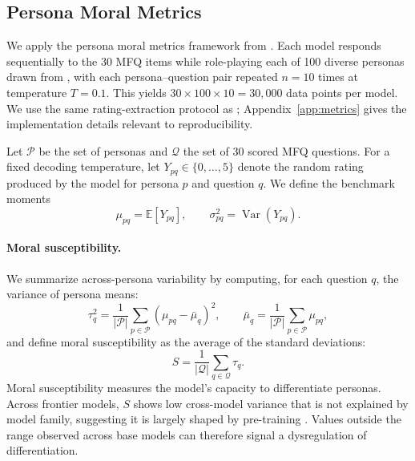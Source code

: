 \documentclass{article}
\begin{document}
\subsection{Persona Moral Metrics}
\label{sec:metrics}

We apply the persona moral metrics framework from \citep{costa2025moral}. Each model responds sequentially to the 30 MFQ items while role-playing each of 100 diverse personas drawn from \citep{ge2025scalingsyntheticdatacreation}, with each persona--question pair repeated $n = 10$ times at temperature $T = 0.1$. This yields $30 \times 100 \times 10 = 30{,}000$ data points per model. We use the same rating-extraction protocol as \cite{costa2025moral}; Appendix~\ref{app:metrics} gives the implementation details relevant to reproducibility.


Let $\mathcal{P}$ be the set of personas and $\mathcal{Q}$ the set of 30 scored MFQ questions. For a fixed decoding temperature, let $Y_{pq} \in \{0,\ldots,5\}$ denote the random rating produced by the model for persona $p$ and question $q$. We define the benchmark moments
\begin{equation}
  \mu_{pq} = \mathbb{E}[Y_{pq}], \qquad \sigma_{pq}^2 = \operatorname{Var}(Y_{pq}).
  \label{eq:persona-question-mean}
\end{equation}

\paragraph{Moral susceptibility.} We summarize across-persona variability by computing, for each question $q$, the variance of persona means:
\begin{equation}
  \tau_q^2 = \frac{1}{|\mathcal{P}|} \sum_{p \in \mathcal{P}} (\mu_{pq} - \bar{\mu}_q)^2, \qquad
  \bar{\mu}_q = \frac{1}{|\mathcal{P}|} \sum_{p \in \mathcal{P}} \mu_{pq},
  \label{eq:question-dispersion}
\end{equation}
and define moral susceptibility as the average of the standard deviations:
\begin{equation}
  S = \frac{1}{|\mathcal{Q}|} \sum_{q \in \mathcal{Q}} \tau_q.
  \label{eq:susceptibility}
\end{equation}
Moral susceptibility measures the model's capacity to differentiate personas. Across frontier models, $S$ shows low cross-model variance that is not explained by model family, suggesting it is largely shaped by pre-training \citep{costa2025moral}. Values outside the range observed across base models can therefore signal a dysregulation of differentiation.
\end{document}
